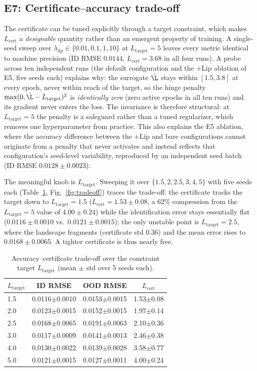 \documentclass[11pt]{article}
\newcommand{\Lhat}{L_{\mathrm{cert}}}
\newcommand{\Ltarget}{L_{\mathrm{target}}}
\begin{document}
\subsection{E7: Certificate--accuracy trade-off}
The certificate can be tuned explicitly through a target constraint, which
makes $\Lhat$ a \emph{designable} quantity rather than an emergent property of
training. A single-seed sweep over
$\lambda_{\mathrm{lip}}\in\{0.01,0.1,1,10\}$ at $\Ltarget=5$ leaves every
metric identical to machine precision (ID RMSE $0.0144$, $\Lhat=3.68$ in all
four runs). A probe across ten independent runs (the default configuration and
the $+$Lip ablation of E5, five seeds each) explains why: the surrogate
$\tilde\L$ stays within $[1.5,3.8]$ at every epoch, never within reach of the
target, so the hinge penalty $\max(0,\tilde\L-\Ltarget)^2$ is
\emph{identically zero} (zero active epochs in all ten runs) and its gradient
never enters the loss. The invariance is therefore structural: at
$\Ltarget=5$ the penalty is a safeguard rather than a tuned regularizer,
which removes one hyperparameter from practice. This also explains the E5
ablation, where the accuracy difference between the $+$Lip and bare
configurations cannot originate from a penalty that never activates and
instead reflects that configuration's seed-level variability, reproduced by an
independent seed batch (ID RMSE $0.0128\pm0.0023$).

The meaningful knob is $\Ltarget$. Sweeping it over $\{1.5,2,2.5,3,4,5\}$
with five seeds each (Table~\ref{tab:e7}, Fig.~\ref{fig:tradeoff}) traces the
trade-off: the certificate tracks the target down to $\Ltarget=1.5$
($\Lhat=1.53\pm0.08$, a $62\%$ compression from the $\Ltarget=5$ value of
$4.00\pm0.24$) while the identification error stays essentially flat
($0.0116\pm0.0010$ vs.\ $0.0121\pm0.0015$); the only unstable point is
$\Ltarget=2.5$, where the landscape fragments (certificate std $0.36$) and
the mean error rises to $0.0168\pm0.0065$. A tighter certificate is thus nearly free.

\begin{table}[t]
\centering\small
\caption{Accuracy--certificate trade-off over the constraint target
$\Ltarget$ (mean $\pm$ std over 5 seeds each).}
\label{tab:e7}
\begin{tabular}{lccc}
\toprule
$\Ltarget$ & ID RMSE & OOD RMSE & $\Lhat$ \\
\midrule
1.5 & 0.0116$\pm$0.0010 & 0.0153$\pm$0.0015 & 1.53$\pm$0.08 \\
2.0 & 0.0123$\pm$0.0015 & 0.0152$\pm$0.0015 & 1.97$\pm$0.14 \\
2.5 & 0.0168$\pm$0.0065 & 0.0191$\pm$0.0063 & 2.10$\pm$0.36 \\
3.0 & 0.0117$\pm$0.0009 & 0.0141$\pm$0.0013 & 2.46$\pm$0.38 \\
4.0 & 0.0130$\pm$0.0022 & 0.0139$\pm$0.0028 & 3.58$\pm$0.77 \\
5.0 & 0.0121$\pm$0.0015 & 0.0127$\pm$0.0011 & 4.00$\pm$0.24 \\
\bottomrule
\end{tabular}
\end{table}
\end{document}
